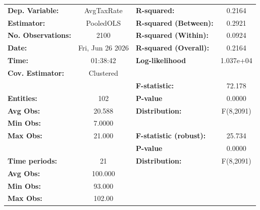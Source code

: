 \begin{center}
\begin{tabular}{lclc}
\toprule
\textbf{Dep. Variable:}                       &     AvgTaxRate     & \textbf{  R-squared:         }   &      0.2164      \\
\textbf{Estimator:}                           &     PooledOLS      & \textbf{  R-squared (Between):}  &      0.2921      \\
\textbf{No. Observations:}                    &        2100        & \textbf{  R-squared (Within):}   &      0.0924      \\
\textbf{Date:}                                &  Fri, Jun 26 2026  & \textbf{  R-squared (Overall):}  &      0.2164      \\
\textbf{Time:}                                &      01:38:42      & \textbf{  Log-likelihood     }   &    1.037e+04     \\
\textbf{Cov. Estimator:}                      &     Clustered      & \textbf{                     }   &                  \\
\textbf{}                                     &                    & \textbf{  F-statistic:       }   &      72.178      \\
\textbf{Entities:}                            &        102         & \textbf{  P-value            }   &      0.0000      \\
\textbf{Avg Obs:}                             &       20.588       & \textbf{  Distribution:      }   &    F(8,2091)     \\
\textbf{Min Obs:}                             &       7.0000       & \textbf{                     }   &                  \\
\textbf{Max Obs:}                             &       21.000       & \textbf{  F-statistic (robust):} &      25.734      \\
\textbf{}                                     &                    & \textbf{  P-value            }   &      0.0000      \\
\textbf{Time periods:}                        &         21         & \textbf{  Distribution:      }   &    F(8,2091)     \\
\textbf{Avg Obs:}                             &      100.000       & \textbf{                     }   &                  \\
\textbf{Min Obs:}                             &       93.000       & \textbf{                     }   &                  \\
\textbf{Max Obs:}                             &       102.00       & \textbf{                     }   &                  \\

\end{tabular}
\end{center}

